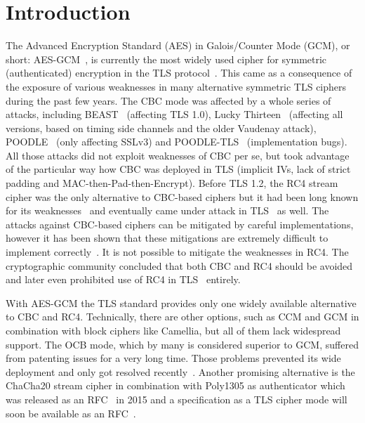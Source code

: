 \documentclass[10pt, a4paper]{article}
\begin{document}
%
\section{Introduction}
The Advanced Encryption Standard (AES) in Galois/Counter Mode (GCM), or short: AES-GCM~\cite{gcm,gcm-nist}, is currently the most widely used cipher for symmetric (authenticated) encryption in
the TLS protocol~\cite{rfc5246}.
This came as a consequence of the exposure of various weaknesses in many alternative symmetric TLS ciphers during the past few years.
The CBC mode was affected by a whole series of attacks, including
BEAST~\cite{BEAST} (affecting TLS 1.0), Lucky Thirteen~\cite{Lucky13} (affecting all versions, based on timing side channels and the older Vaudenay attack), POODLE~\cite{POODLE} (only affecting SSLv3)
and POODLE-TLS~\cite{PoodleAgain} (implementation bugs).
All those attacks did not exploit weaknesses of CBC per se, but took advantage of the particular way how CBC was deployed in TLS (implicit IVs, lack of strict padding and MAC-then-Pad-then-Encrypt).
Before TLS 1.2, the RC4 stream cipher was the only alternative to CBC-based ciphers but
it had been long known for its weaknesses~\cite{SAC:FluManSha01} and eventually came under attack in TLS~\cite{RC4biases} as well.
The attacks against CBC-based ciphers can be mitigated by careful implementations, however it has been
shown that these mitigations are extremely difficult to implement correctly~\cite{somorovsky2016}.
It is not possible to mitigate the weaknesses in RC4.
The cryptographic community concluded that both CBC and RC4 should be avoided and later even prohibited use of RC4 in TLS~\cite{rfc7465} entirely.

With AES-GCM the TLS standard provides only one widely available alternative to CBC and RC4.
Technically, there are other options, such as CCM and GCM in combination with block ciphers like Camellia, but all of them lack widespread support.
The OCB mode, which by many is considered superior to GCM, suffered from patenting issues for a very long time. Those problems prevented its wide deployment and only got resolved recently~\cite{draft-ocb-zauner}.
Another promising alternative is the ChaCha20 stream cipher in combination with Poly1305 as authenticator which was released as an RFC~\cite{rfc7539} in 2015
and a specification as a TLS cipher mode will soon be available as an RFC~\cite{draft-chacha-langely}.
\end{document}
